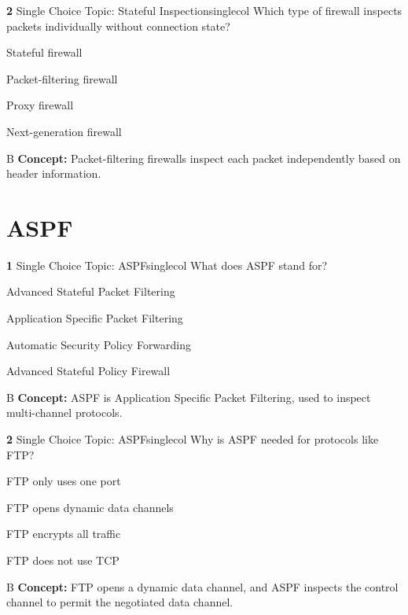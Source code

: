 \documentclass[10pt,a4paper]{article}
\begin{document}
\begin{qcard}{\color{white}\textbf{2} \hfill \small Single Choice \textbar{} Topic: Stateful Inspection}{singlecol}
Which type of firewall inspects packets individually without connection state?

\begin{qoptions}
\item Stateful firewall
\item Packet-filtering firewall
\item Proxy firewall
\item Next-generation firewall
\end{qoptions}
\begin{explainbox}{B}
\textbf{Concept:} Packet-filtering firewalls inspect each packet independently based on header information.
\end{explainbox}
\end{qcard}

\section{ASPF}
\begin{qcard}{\color{white}\textbf{1} \hfill \small Single Choice \textbar{} Topic: ASPF}{singlecol}
What does ASPF stand for?

\begin{qoptions}
\item Advanced Stateful Packet Filtering
\item Application Specific Packet Filtering
\item Automatic Security Policy Forwarding
\item Advanced Stateful Policy Firewall
\end{qoptions}
\begin{explainbox}{B}
\textbf{Concept:} ASPF is Application Specific Packet Filtering, used to inspect multi-channel protocols.
\end{explainbox}
\end{qcard}

\begin{qcard}{\color{white}\textbf{2} \hfill \small Single Choice \textbar{} Topic: ASPF}{singlecol}
Why is ASPF needed for protocols like FTP?

\begin{qoptions}
\item FTP only uses one port
\item FTP opens dynamic data channels
\item FTP encrypts all traffic
\item FTP does not use TCP
\end{qoptions}
\begin{explainbox}{B}
\textbf{Concept:} FTP opens a dynamic data channel, and ASPF inspects the control channel to permit the negotiated data channel.
\end{explainbox}
\end{qcard}
\end{document}
